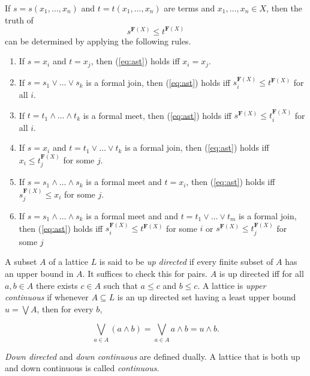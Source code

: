 {\begin{theorem}
  \label{thm:wordprob}
If $s = s(x_1, \dots, x_n)$ and $t = t(x_1, \dots, x_n)$ are terms and $x_1, \dots, x_n \in X$, then the truth of 
\begin{equation}
  \label{eq:ast}
s^{\mathbf{F}(X)} \leqslant t^{\mathbf{F}(X)}
\end{equation}
can be determined by applying the following rules.
\begin{enumerate}
\item If $s=x_i$ and $t=x_j$, then (\ref{eq:ast}) holds iff $x_i = x_j$.
\item If $s = s_1 \vee \dots \vee s_k$ is a formal join, then (\ref{eq:ast}) holds iff $s_i^{\mathbf{F}(X)} \leqslant t^{\mathbf{F}(X)}$ for all $i$.
\item If $t = t_1 \wedge \dots \wedge t_k$ is a formal meet, then (\ref{eq:ast}) holds iff 
$s^{\mathbf{F}(X)} \leqslant t_i^{\mathbf{F}(X)}$ for all $i$.
\item If $s = x_i$ and $t = t_1 \vee \dots \vee t_k$ is a formal join, 
   then (\ref{eq:ast}) holds iff $x_i \leqslant t_j^{\mathbf{F}(X)}$ for some $j$.
\item If $s = s_1 \wedge \dots \wedge s_k$ is a formal meet and $t = x_i$, then (\ref{eq:ast}) holds iff $s_j^{\mathbf{F}(X)} \leqslant x_i$ for some $j$.
\item If $s = s_1 \wedge \dots \wedge s_k$ is a formal meet and 
and $t = t_1 \vee \dots \vee t_m$ is a formal join, then (\ref{eq:ast}) holds iff 
$s_i^{\mathbf{F}(X)} \leqslant t^{\mathbf{F}(X)}$ for some $i$
or $s^{\mathbf{F}(X)} \leqslant t_j^{\mathbf{F}(X)}$ for some $j$
\end{enumerate}

\end{theorem}

\begin{definition} A subset $A$ of a lattice $L$ is said to be \emph{up directed} if every finite subset of $A$ has an upper bound in $A$.
It suffices to check this for pairs.  $A$ is up directed iff for all $a, b \in A$
there exists $c\in A$ such that $a\leqslant c$ and $b\leqslant c$.  A lattice is \emph{upper continuous} if whenever $A\subseteq L$ is an up directed set having a least upper
bound $u = \bigvee A$, then for every $b$,

\[\bigvee_{a\in A} (a \wedge b) = 
\bigvee_{a\in A} a \wedge b =  u \wedge b.\]

\emph{Down directed} and \emph{down continuous} are defined dually.  A lattice that is 
both up and down continuous is called \emph{continuous}.
\end{definition}

}
